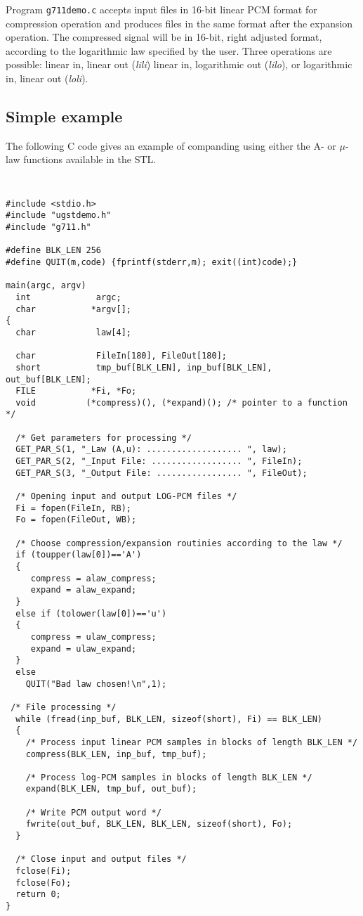 Program {\tt g711demo.c} accepts input files in 16-bit linear PCM
format for compression operation and produces files in the same format
after the expansion operation. The compressed signal will be in
16-bit, right adjusted format, according to the logarithmic law
specified by the user. Three operations are possible: linear in,
linear out ({\em lili}) linear in, logarithmic out ({\em lilo}), or
logarithmic in, linear out ({\em loli}).

\subsection {Simple example}

The following C code gives an example of companding using either the
A- or $\mu$-law functions available in the STL. 

{\tt\small 
\begin{verbatim}
#include <stdio.h> 
#include "ugstdemo.h" 
#include "g711.h"

#define BLK_LEN 256
#define QUIT(m,code) {fprintf(stderr,m); exit((int)code);}

main(argc, argv)
  int             argc;
  char           *argv[];
{
  char            law[4];

  char            FileIn[180], FileOut[180];
  short           tmp_buf[BLK_LEN], inp_buf[BLK_LEN], out_buf[BLK_LEN];
  FILE           *Fi, *Fo;
  void          (*compress)(), (*expand)(); /* pointer to a function */

  /* Get parameters for processing */
  GET_PAR_S(1, "_Law (A,u): ................... ", law);
  GET_PAR_S(2, "_Input File: .................. ", FileIn);
  GET_PAR_S(3, "_Output File: ................. ", FileOut);

  /* Opening input and output LOG-PCM files */
  Fi = fopen(FileIn, RB);
  Fo = fopen(FileOut, WB);

  /* Choose compression/expansion routinies according to the law */
  if (toupper(law[0])=='A')
  {
     compress = alaw_compress;
     expand = alaw_expand;
  }
  else if (tolower(law[0])=='u')
  {
     compress = ulaw_compress;
     expand = ulaw_expand;
  }
  else 
    QUIT("Bad law chosen!\n",1);

 /* File processing */
  while (fread(inp_buf, BLK_LEN, sizeof(short), Fi) == BLK_LEN)
  {
    /* Process input linear PCM samples in blocks of length BLK_LEN */
    compress(BLK_LEN, inp_buf, tmp_buf);

    /* Process log-PCM samples in blocks of length BLK_LEN */
    expand(BLK_LEN, tmp_buf, out_buf);

    /* Write PCM output word */
    fwrite(out_buf, BLK_LEN, BLK_LEN, sizeof(short), Fo);
  }

  /* Close input and output files */
  fclose(Fi);
  fclose(Fo);
  return 0;
}
\end{verbatim}
}
